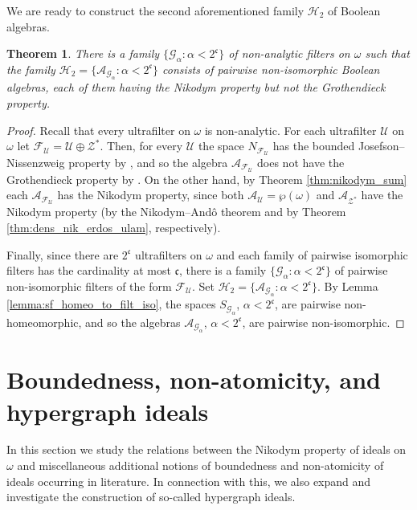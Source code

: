 \documentclass[a4paper,11pt,fleqn]{amsart}
\newtheorem{theorem}{Theorem}[section]
\theoremstyle{definition}
\theoremstyle{remark}
\numberwithin{equation}{section}
\newcommand{\frakc}{\mathfrak{c}}
\newcommand{\N}{\mathbb{N}}
\newcommand{\aA}{\mathcal{A}}
\newcommand{\fF}{\mathcal{F}}
\newcommand{\gG}{\mathcal{G}}
\newcommand{\hH}{\mathcal{H}}
\newcommand{\uU}{\mathcal{U}}
\newcommand{\zZ}{\mathcal{Z}}
\newcommand{\wo}{{\wp(\omega)}}%
\begin{document}
We are ready to construct the second aforementioned family $\hH_2$ of Boolean algebras.

\begin{theorem}\label{thm:two_to_continuum}
There is a family $\big\{\gG_\alpha\colon \alpha<2^\frakc\big\}$ of non-analytic filters on $\omega$ such that the family $\hH_2=\big\{\aA_{\gG_\alpha}\colon \alpha<2^\frakc\big\}$ consists of pairwise non-isomorphic Boolean algebras, each of them having the Nikodym property but not the Grothendieck property.
\end{theorem}
\begin{proof}
Recall that every ultrafilter on $\omega$ is non-analytic. For each ultrafilter $\uU$ on $\omega$ let $\fF_\uU=\uU\oplus\zZ^*$. Then, for every $\uU$ the space $N_{\fF_\uU}$ has the bounded Josefson--Nissenzweig property by \cite[Theorem C and Proposition 5.17]{MS24}, and so the algebra $\aA_{\fF_\uU}$ does not have the Grothendieck property by \cite[Corollary D]{MS24}. On the other hand, by Theorem \ref{thm:nikodym_sum} each $\aA_{\fF_\uU}$ has the Nikodym property, since both $\aA_\uU=\wo$ and $\aA_{\zZ^*}$ have the Nikodym property (by the Nikodym--And\^{o} theorem and by Theorem \ref{thm:dens_nik_erdos_ulam}, respectively).

Finally, since there are $2^\frakc$ ultrafilters on $\omega$ and
each family of pairwise isomorphic filters has the cardinality at most $\frakc$, there is a family $\big\{\gG_\alpha\colon \alpha<2^\frakc\big\}$ of pairwise non-isomorphic filters of the form $\fF_\uU$. Set $\hH_2=\big\{\aA_{\gG_\alpha}\colon\alpha<2^\frakc\big\}$. By Lemma \ref{lemma:sf_homeo_to_filt_iso}, the spaces $S_{\gG_\alpha}$, $\alpha<2^\frakc$, are pairwise non-homeomorphic, and so the algebras $\aA_{\gG_\alpha}$, $\alpha<2^\frakc$, are pairwise non-isomorphic.
\end{proof}

\section{Boundedness, non-atomicity, and hypergraph ideals\label{sec:nonatomic}}

In this section we study the relations between the Nikodym property of ideals on $\omega$ and miscellaneous additional notions of boundedness and non-atomicity of ideals occurring in literature. In connection with this, we also expand and investigate the construction of so-called hypergraph ideals.
\end{document}
